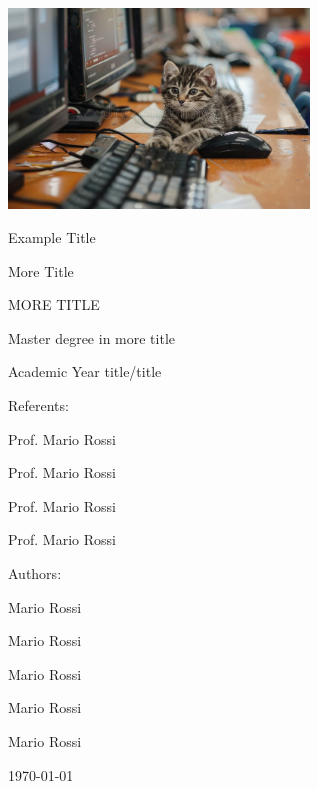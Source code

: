 \documentclass[10pt,  english, makeidx, a4paper, titlepage, oneside]{book}
\begin{document}
\frontmatter
\begin{titlepage}
\vspace{0cm}
\centerline{
\includegraphics[width=0.6\textwidth]{chapters/figures/cat.png}} 
\vspace{0.5cm}
\centerline{\huge\sf Example Title}
\vspace{1cm}
\centerline{\Huge\sf More Title}
\bigskip
\centerline{\huge\sf MORE TITLE}
\vspace{1cm}
\centerline{\Large Master degree in more title}
\centerline{\Large Academic Year title/title}
\vspace{2.5cm}
%
{\large Referents:}

Prof. Mario Rossi

Prof. Mario Rossi

Prof. Mario Rossi 

Prof. Mario Rossi

\bigskip
\vspace{1cm}
%
%
{\large Authors:}
%

Mario Rossi

Mario Rossi

Mario Rossi

Mario Rossi

Mario Rossi

%
\begin{center}
    {\large \today}
\end{center}
\end{titlepage}



\tableofcontents

\mainmatter
%    
%


% 
% 
% 
% 
% 
%
%    
%
\appendix

% 
%
\end{document}
